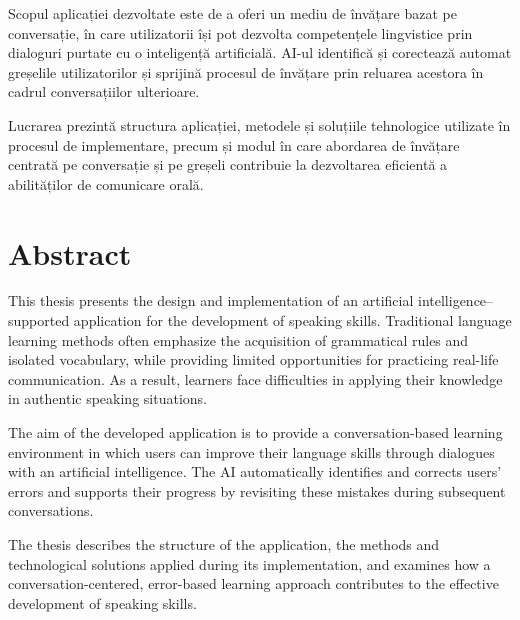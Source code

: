 Scopul aplicației dezvoltate este de a oferi un mediu de învățare bazat pe conversație, în care utilizatorii își pot dezvolta competențele lingvistice prin dialoguri purtate cu o inteligență artificială. AI-ul identifică și corectează automat greșelile utilizatorilor și sprijină procesul de învățare prin reluarea acestora în cadrul conversațiilor ulterioare.

Lucrarea prezintă structura aplicației, metodele și soluțiile tehnologice utilizate în procesul de implementare, precum și modul în care abordarea de învățare centrată pe conversație și pe greșeli contribuie la dezvoltarea eficientă a abilităților de comunicare orală.

\vfill
{}

\chapter*{Abstract}

This thesis presents the design and implementation of an artificial intelligence–supported application for the development of speaking skills. Traditional language learning methods often emphasize the acquisition of grammatical rules and isolated vocabulary, while providing limited opportunities for practicing real-life communication. As a result, learners face difficulties in applying their knowledge in authentic speaking situations.

The aim of the developed application is to provide a conversation-based learning environment in which users can improve their language skills through dialogues with an artificial intelligence. The AI automatically identifies and corrects users’ errors and supports their progress by revisiting these mistakes during subsequent conversations.

The thesis describes the structure of the application, the methods and technological solutions applied during its implementation, and examines how a conversation-centered, error-based learning approach contributes to the effective development of speaking skills.


\vfill
\dolgozatnyelve
{}